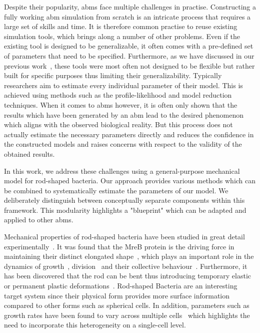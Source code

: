 \documentclass{article}
\begin{document}
Despite their popularity, \acp{abm} face multiple challenges in practise.
Constructing a fully working \ac{abm} simulation from scratch is an intricate process that requires
a large set of skills and time.
It is therefore common practise to reuse existing simulation tools, which brings along a number of
other problems.
Even if the existing tool is designed to be generalizable, it often comes with a pre-defined set
of parameters that need to be specified.
Furthermore, as we have discussed in our previous work~\cite{Pleyer2023}, these tools were most
often not designed to be flexible but rather built for specific purposes thus limiting their
generalizability.
Typically researchers aim to estimate every individual parameter of their model.
This is achieved using methods such as the profile-likelihood and model reduction techniques.
When it comes to \acp{abm} however, it is often only shown that the results which have been
generated by an \ac{abm} lead to the desired phenomenon which aligns with the observed biological
reality.
But this process does not actually estimate the necessary parameters directly
and reduces the confidence in the constructed models and raises concerns with respect to the
validity of the obtained results.

In this work, we address these challenges using a general-purpose mechanical model for rod-shaped
bacteria.
Our approach provides various methods which can be combined to systematically estimate the
parameters of our model.
We deliberately distinguish between conceptually separate components within this framework.
This modularity highlights a "blueprint" which can be adapted and applied to other \acp{abm}.

Mechanical properties of rod-shaped bacteria have been studied in great detail
experimentally~\cite{Chatterjee1988,Takeuchi2005,IWAI2002}.
It was found that the MreB protein is the driving force in maintaining their distinct elongated
shape~\cite{Ursell2014}, which plays an important role in the dynamics of
growth~\cite{Billaudeau2017}, division~\cite{Harry2001} and their collective
behaviour~\cite{vanGestel2015}.
Furthermore, it has been discovered that the rod can be bent thus introducing temporary elastic or
permanent plastic deformations~\cite{Amir2014_2}.
Rod-shaped Bacteria are an interesting target system since their physical form provides more surface
information compared to other forms such as spherical cells.
In addition, parameters such as growth rates have been found to vary across multiple
cells~\cite{Koutsoumanis2013} which highlights the need to incorporate this heterogeneity on a
single-cell level.
\end{document}

